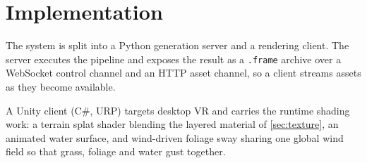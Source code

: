 \section{Implementation}
\label{sec:implementation}

The system is split into a Python generation server and a rendering client. The
server executes the pipeline and exposes the result as a \texttt{.frame} archive
over a WebSocket control channel and an HTTP asset channel, so a client streams
assets as they become available.

A Unity client (C\#, URP) targets desktop VR and carries the
runtime shading work: a terrain splat shader blending the layered material of
\cref{sec:texture}, an animated water surface, and wind-driven foliage sway
sharing one global wind field so that grass, foliage and water gust together.
